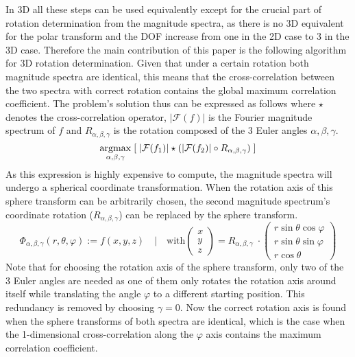 In 3D all these steps can be used equivalently except for the crucial part of rotation determination from the magnitude spectra, as there is no 3D equivalent for the polar transform and the DOF increase from one in the 2D case to 3 in the 3D case.
Therefore the main contribution of this paper is the following algorithm for 3D rotation determination.
Given that under a certain rotation both magnitude spectra are identical, this means that the cross-correlation between the two spectra with correct rotation contains the global maximum correlation coefficient.
The problem's solution thus can be expressed as follows where $\star$ denotes the cross-correlation operator, $|\mathcal{F}(f)|$ is the Fourier magnitude spectrum of $f$ and $R_{\alpha,\beta,\gamma}$ is the rotation composed of the 3 Euler angles $\alpha,\beta,\gamma$.
\begin{equation}
\operatorname*{argmax}_{\alpha,\beta,\gamma}\;[\;|\mathcal{F}(f_1)| \star (|\mathcal{F}(f_2)| \circ R_{\alpha,\beta,\gamma})\;]
\end{equation}
As this expression is highly expensive to compute, the magnitude spectra will undergo a spherical coordinate transformation. 
When the rotation axis of this sphere transform can be arbitrarily chosen, the second magnitude spectrum's coordinate rotation ($R_{\alpha,\beta,\gamma}$) can be replaced by the sphere transform.
\begin{equation}\label{eq:rotatedspheretransform}
\Phi_{\alpha,\beta,\gamma}(r,\theta,\varphi) := f(x,y,z) \quad|\quad \text{with} 
\begin{pmatrix}
x \\ y \\ z
\end{pmatrix}
= R_{\alpha,\beta,\gamma} \; \cdot
\begin{pmatrix}
r \sin \theta \cos \varphi \\ 
r \sin \theta \sin \varphi \\ 
r \cos \theta
\end{pmatrix}
\end{equation}
Note that for choosing the rotation axis of the sphere transform, only two of the 3 Euler angles are needed as one of them only rotates the rotation axis around itself while translating the angle $\varphi$ to a different starting position. 
This redundancy is removed by choosing $\gamma=0$.
Now the correct rotation axis is found when the sphere transforms of both spectra are identical, which is the case when the 1-dimensional cross-correlation along the $\varphi$ axis contains the maximum correlation coefficient.
